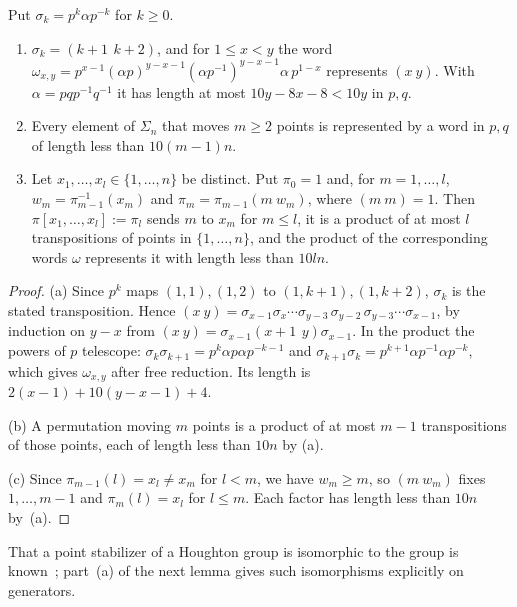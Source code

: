 \begin{lemma}\label{lem:transpositions}
Put $\sigma_k=p^k\alpha p^{-k}$ for $k\ge0$.
\begin{enumerate}[label=(\alph*),itemsep=1pt]
\item $\sigma_k=(k+1\ \,k+2)$, and for $1\le x<y$ the word
$\omega_{x,y}=p^{x-1}(\alpha p)^{y-x-1}(\alpha p^{-1})^{y-x-1}\alpha\,p^{1-x}$ represents $(x\ y)$. With $\alpha=pqp^{-1}q^{-1}$ it has length at most
$10y-8x-8<10y$ in $p,q$.
\item Every element of $\Sigma_n$ that moves $m\ge2$ points is represented by a word in $p,q$ of length less than $10(m-1)n$.
\item Let $x_1,\dots,x_l\in\{1,\dots,n\}$ be distinct. Put $\pi_0=1$ and, for $m=1,\dots,l$, $w_m=\pi_{m-1}^{-1}(x_m)$ and
$\pi_m=\pi_{m-1}(m\ w_m)$, where $(m\ m)=1$. Then $\pi[x_1,\dots,x_l]:=\pi_l$ sends $m$ to $x_m$ for $m\le l$, it is a product of at most $l$
transpositions of points in $\{1,\dots,n\}$, and the product of the corresponding words $\omega$ represents it with length less than $10ln$.
\end{enumerate}
\end{lemma}

\begin{proof}
(a) Since $p^k$ maps $(1,1),(1,2)$ to $(1,k+1),(1,k+2)$, $\sigma_k$ is the stated transposition. Hence
$(x\ y)=\sigma_{x-1}\sigma_x\cdots\sigma_{y-3}\,\sigma_{y-2}\,\sigma_{y-3}\cdots\sigma_{x-1}$, by induction on $y-x$ from
$(x\ y)=\sigma_{x-1}(x{+}1\ \,y)\sigma_{x-1}$. In the product the powers of $p$ telescope: $\sigma_k\sigma_{k+1}=p^k\alpha p\alpha p^{-k-1}$ and
$\sigma_{k+1}\sigma_k=p^{k+1}\alpha p^{-1}\alpha p^{-k}$, which gives $\omega_{x,y}$ after free reduction. Its length is
$2(x-1)+10(y-x-1)+4$.

(b) A permutation moving $m$ points is a product of at most $m-1$ transpositions of those points, each of length less than $10n$ by (a).

(c) Since $\pi_{m-1}(l)=x_l\ne x_m$ for $l<m$, we have $w_m\ge m$, so $(m\ w_m)$ fixes $1,\dots,m-1$ and $\pi_m(l)=x_l$ for $l\le m$. Each factor
has length less than $10n$ by~(a).
\end{proof}

That a point stabilizer of a Houghton group is isomorphic to the group is known~\cite[Example~3.6]{Cornulier2006}; part~(a) of the next lemma
gives such isomorphisms explicitly on generators.

